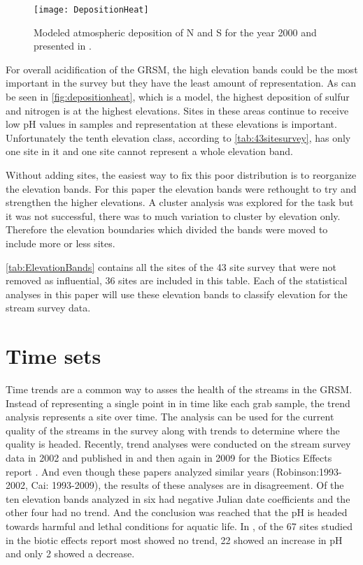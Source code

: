 \begin{figure}[h!]
  \centering
  \texttt{[image: DepositionHeat]}\\
  \caption{ Modeled atmospheric deposition of N and S for the year 2000 and presented in \citet{weathers2006}.}\label{fig:depositionheat}
\end{figure}

For overall acidification of the GRSM, the high elevation bands could be the most important in the survey but they have the least amount of representation.
As can be seen in \autoref{fig:depositionheat}, which is a model, the highest deposition of sulfur and nitrogen is at the highest elevations.
Sites in these areas continue to receive low pH values in samples and representation at these elevations is important.
Unfortunately the tenth elevation class, according to \autoref{tab:43sitesurvey}, has only one site in it and one site cannot represent a whole elevation band.

Without adding sites, the easiest way to fix this poor distribution is to reorganize the elevation bands. 
For this paper the elevation bands were rethought to try and strengthen the higher elevations.
A cluster analysis was explored for the task but it was not successful, there was to much variation to cluster by elevation only.
Therefore the elevation boundaries which divided the bands were moved to include more or less sites.



\autoref{tab:ElevationBands} contains all the sites of the 43 site survey that were not removed as influential, 36 sites are included in this table.
Each of the statistical analyses in this paper will use these elevation bands to classify elevation for the stream survey data.

\section{Time sets}

Time trends are a common way to asses the health of the streams in the GRSM.
Instead of representing a single point in in time like each grab sample, the trend analysis represents a site over time.
The analysis can be used for the current quality of the streams in the survey along with trends to determine where the quality is headed. 
Recently, trend analyses were conducted on the stream survey data in 2002 and published in \citet{robinson2008ph} and then again in 2009 for the Biotics Effects report \citep{cai2013}.
And even though these papers analyzed similar years (Robinson:1993-2002, Cai: 1993-2009), the results of these analyses are in disagreement.
Of the ten elevation bands analyzed in \citet{robinson2008ph} six had negative Julian date coefficients and the other four had no trend.
And the conclusion was reached that the pH is headed towards harmful and lethal conditions for aquatic life. 
In \citet{cai2013}, of the 67 sites studied in the biotic effects report most showed no trend, 22 showed an increase in pH and only 2 showed a decrease. 

